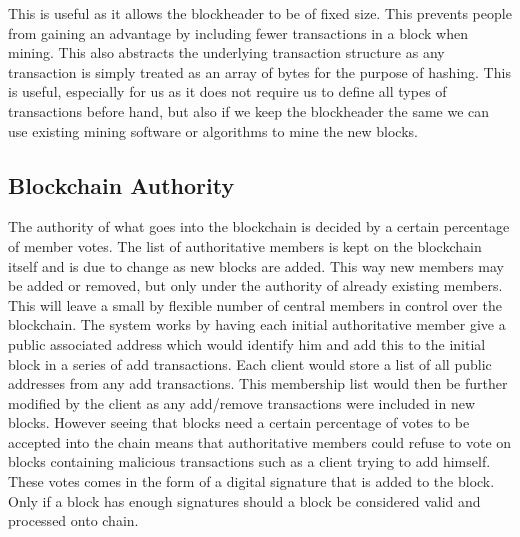 \documentclass[11pt]{article}
\begin{document}

This is useful as it allows the blockheader to be of fixed size. This prevents people from gaining an advantage by including fewer transactions in a block when mining. This also abstracts the underlying transaction structure as any transaction is simply treated as an array of bytes for the purpose of hashing. This is useful, especially for us as it does not require us to define all types of transactions before hand, but also if we keep the blockheader the same we can use existing mining software or algorithms to mine the new blocks.

\subsection{Blockchain Authority}\label{subsec:authority}

The authority of what goes into the blockchain is decided by a certain percentage of member votes. The list of authoritative members is kept on the blockchain itself and is due to change as new blocks are added. This way new members may be added or removed, but only under the authority of already existing members. This will leave a small by flexible number of central members in control over the blockchain. The system works by having each initial authoritative member give a public associated address which would identify him and add this to the initial block in a series of add transactions. Each client would store a list of all public addresses from any add transactions. This membership list would then be further modified by the client as any add/remove transactions were included in new blocks. However seeing that blocks need a certain percentage of votes to be accepted into the chain means that authoritative members could refuse to vote on blocks containing malicious transactions such as a client trying to add himself. These votes comes in the form of a digital signature that is added to the block. Only if a block has enough signatures should a block be considered valid and processed onto chain. 

\end{document}
